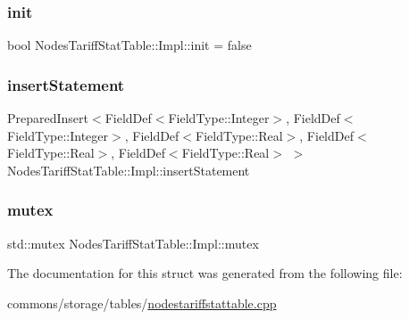 \mbox{\label{struct_nodes_tariff_stat_table_1_1_impl_afec85299c0bb3976803ae64f3d51f90f}} 
\subsubsection{\texorpdfstring{init}{init}}
{\footnotesize\ttfamily bool Nodes\+Tariff\+Stat\+Table\+::\+Impl\+::init = false}

\mbox{\label{struct_nodes_tariff_stat_table_1_1_impl_a799754ca1a2c59f9c7bf8787a80efb29}} 
\subsubsection{\texorpdfstring{insertStatement}{insertStatement}}
{\footnotesize\ttfamily Prepared\+Insert$<$Field\+Def$<$Field\+Type\+::\+Integer$>$, Field\+Def$<$Field\+Type\+::\+Integer$>$, Field\+Def$<$Field\+Type\+::\+Real$>$, Field\+Def$<$Field\+Type\+::\+Real$>$, Field\+Def$<$Field\+Type\+::\+Real$>$ $>$ Nodes\+Tariff\+Stat\+Table\+::\+Impl\+::insert\+Statement}

\mbox{\label{struct_nodes_tariff_stat_table_1_1_impl_ad1d001d2359640345238ff5dab04d127}} 
\subsubsection{\texorpdfstring{mutex}{mutex}}
{\footnotesize\ttfamily std\+::mutex Nodes\+Tariff\+Stat\+Table\+::\+Impl\+::mutex}



The documentation for this struct was generated from the following file\+:\begin{DoxyCompactItemize}
\item 
commons/storage/tables/\mbox{\hyperlink{nodestariffstattable_8cpp}{nodestariffstattable.\+cpp}}\end{DoxyCompactItemize}
